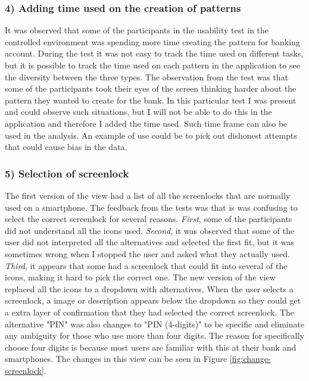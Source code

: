     \subsubsection*{4) Adding time used on the creation of patterns}
    It was observed that some of the participants in the usability test in the controlled environment was spending more time creating the pattern for banking account. During the test it was not easy to track the time used on different tasks, but it is possible to track the time used on each pattern in the application to see the diversity between the three types. The observation from the test was that some of the participants took their eyes of the screen thinking harder about the pattern they wanted to create for the bank. In this particular test I was present and could observe such situations, but I will not be able to do this in the application and therefore I added the time used. Such time frame can also be used in the analysis. An example of use could be to pick out dishonest attempts that could cause bias in the data. 
      
    \subsubsection*{5) Selection of screenlock}
    The first version of the view had a list of all the screenlocks that are normally used on a smartphone. The feedback from the tests was that is was confusing to select the correct screenlock for several reasons. {\it First}, some of the participants did not understand all the icons used. {\it Second}, it was observed that some of the user did not interpreted all the alternatives and selected the first fit, but it was sometimes wrong when I stopped the user and asked what they actually used. {\it Third}, it appears that some had a screenlock that could fit into several of the icons, making it hard to pick the correct one. The new version of the view replaced all the icons to a dropdown with alternatives. When the user selects a screenlock, a image or description appears below the dropdown so they could get a extra layer of confirmation that they had selected the correct screenlock. The alternative "PIN" was also changes to "PIN (4-digits)" to be specific and eliminate any ambiguity for those who use more than four digits. The reason for specifically choose four digits is because most users are familiar with this at their bank and smartphones. The changes in this view can be seen in Figure \ref{fig:change-screenlock}.
    

